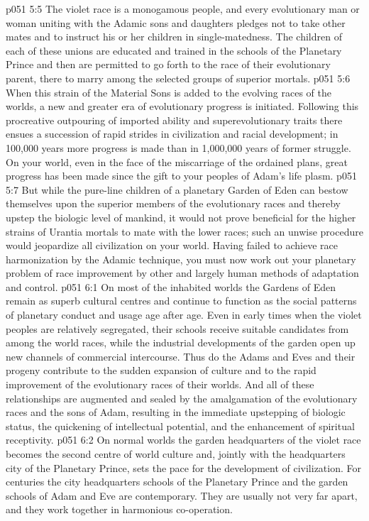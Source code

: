 \vs p051 5:5 \pc The violet race is a monogamous people, and every evolutionary man or woman uniting with the Adamic sons and daughters pledges not to take other mates and to instruct his or her children in single\hyp{}matedness. The children of each of these unions are educated and trained in the schools of the Planetary Prince and then are permitted to go forth to the race of their evolutionary parent, there to marry among the selected groups of superior mortals.
\vs p051 5:6 When this strain of the Material Sons is added to the evolving races of the worlds, a new and greater era of evolutionary progress is initiated. Following this procreative outpouring of imported ability and superevolutionary traits there ensues a succession of rapid strides in civilization and racial development; in 100,000 years more progress is made than in 1,000,000 years of former struggle. On your world, even in the face of the miscarriage of the ordained plans, great progress has been made since the gift to your peoples of Adam’s life plasm.
\vs p051 5:7 But while the pure\hyp{}line children of a planetary Garden of Eden can bestow themselves upon the superior members of the evolutionary races and thereby upstep the biologic level of mankind, it would not prove beneficial for the higher strains of Urantia mortals to mate with the lower races; such an unwise procedure would jeopardize all civilization on your world. Having failed to achieve race harmonization by the Adamic technique, you must now work out your planetary problem of race improvement by other and largely human methods of adaptation and control.
\vs p051 6:1 On most of the inhabited worlds the Gardens of Eden remain as superb cultural centres and continue to function as the social patterns of planetary conduct and usage age after age. Even in early times when the violet peoples are relatively segregated, their schools receive suitable candidates from among the world races, while the industrial developments of the garden open up new channels of commercial intercourse. Thus do the Adams and Eves and their progeny contribute to the sudden expansion of culture and to the rapid improvement of the evolutionary races of their worlds. And all of these relationships are augmented and sealed by the amalgamation of the evolutionary races and the sons of Adam, resulting in the immediate upstepping of biologic status, the quickening of intellectual potential, and the enhancement of spiritual receptivity.
\vs p051 6:2 On normal worlds the garden headquarters of the violet race becomes the second centre of world culture and, jointly with the headquarters city of the Planetary Prince, sets the pace for the development of civilization. For centuries the city headquarters schools of the Planetary Prince and the garden schools of Adam and Eve are contemporary. They are usually not very far apart, and they work together in harmonious co\hyp{}operation.
